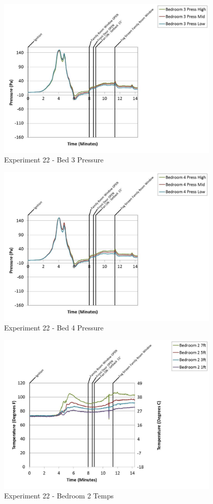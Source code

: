 \documentclass{article}
\begin{document}
\begin{appendices}
	\begin{figure}[h!]
		\centering
		\includegraphics[height=3.05in]{0_Images/Results_Charts/Exp_22_Charts/Bed3Pressure.pdf}
		\caption{Experiment 22 - Bed 3 Pressure}
	\end{figure}
 
	\clearpage

	\begin{figure}[h!]
		\centering
		\includegraphics[height=3.05in]{0_Images/Results_Charts/Exp_22_Charts/Bed4Pressure.pdf}
		\caption{Experiment 22 - Bed 4 Pressure}
	\end{figure}
 

	\begin{figure}[h!]
		\centering
		\includegraphics[height=3.05in]{0_Images/Results_Charts/Exp_22_Charts/Bedroom2Temps.pdf}
		\caption{Experiment 22 - Bedroom 2 Temps}
	\end{figure}
 

\end{appendices}
\end{document}
